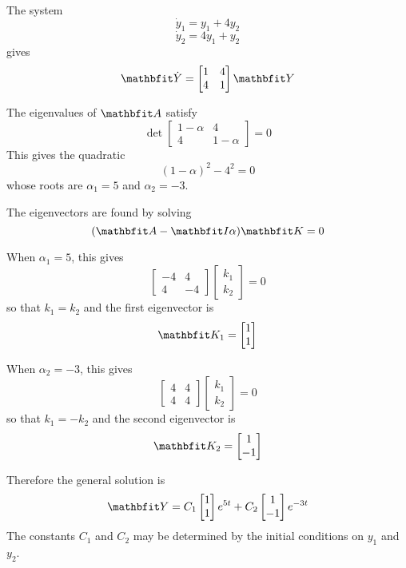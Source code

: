 \begin{example}
The system
$$\dot{y}_1=y_1+4y_2$$
$$\dot{y}_2=4y_1+y_2$$
gives
$$\vect{\dot{Y}}=\begin{bmatrix} 1 & 4 \\ 4 & 1 \end{bmatrix} \vect{Y}$$

The eigenvalues of $\vect{A}$ satisfy
$$\det \begin{bmatrix} 1-\alpha & 4 \\ 4 & 1-\alpha \end{bmatrix}=0$$
This gives the quadratic
$$(1-\alpha)^2-4^2=0$$
whose roots are $\alpha_1=5$ and $\alpha_2=-3$.

The eigenvectors are found by solving
$$(\vect{A}-\vect{I}\alpha)\vect{K}=0$$

When $\alpha_1=5$, this gives
$$\begin{bmatrix} -4 & 4 \\ 4 & -4\end{bmatrix}
\begin{bmatrix}k_1 \\ k_2 \end{bmatrix}=0$$
so that $k_1=k_2$ and the first eigenvector is
$$\vect{K}_1=\begin{bmatrix} 1 \\ 1 \end{bmatrix}$$

When $\alpha_2=-3$, this gives
$$\begin{bmatrix} 4 & 4 \\ 4 & 4\end{bmatrix}
\begin{bmatrix}k_1 \\ k_2 \end{bmatrix}=0$$
so that $k_1=-k_2$ and the second eigenvector is
$$\vect{K}_2=\begin{bmatrix} 1 \\ -1 \end{bmatrix}$$

Therefore the general solution is
$$\vect{Y}=C_1\begin{bmatrix} 1 \\ 1 \end{bmatrix}e^{5t}
+C_2\begin{bmatrix} 1 \\ -1 \end{bmatrix}e^{-3t}$$
The constants $C_1$ and $C_2$ may be determined by the initial conditions on
$y_1$ and $y_2$.
\end{example}

